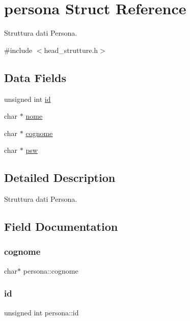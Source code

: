 \hypertarget{structpersona}{}\section{persona Struct Reference}
\label{structpersona}


Struttura dati Persona.  




{\ttfamily \#include $<$head\+\_\+strutture.\+h$>$}

\subsection*{Data Fields}
\begin{DoxyCompactItemize}
\item 
unsigned int \hyperlink{structpersona_af1c7ef8e0cee4943c4f08eef1615eddb}{id}
\item 
char $\ast$ \hyperlink{structpersona_a2ed3f97d34f345afe9db642281887d22}{nome}
\item 
char $\ast$ \hyperlink{structpersona_adadc0966a1e4a620eb46c8c44ddd8f24}{cognome}
\item 
char $\ast$ \hyperlink{structpersona_a1deff419a5867b08c46201d4d439035e}{psw}
\end{DoxyCompactItemize}


\subsection{Detailed Description}
Struttura dati Persona. 

\subsection{Field Documentation}
\mbox{\label{structpersona_adadc0966a1e4a620eb46c8c44ddd8f24}} 
\subsubsection{\texorpdfstring{cognome}{cognome}}
{\footnotesize\ttfamily char$\ast$ persona\+::cognome}

\mbox{\label{structpersona_af1c7ef8e0cee4943c4f08eef1615eddb}} 
\subsubsection{\texorpdfstring{id}{id}}
{\footnotesize\ttfamily unsigned int persona\+::id}

